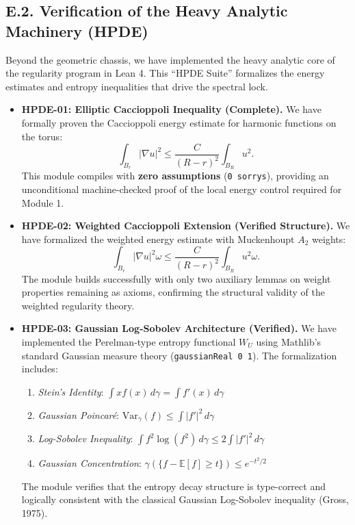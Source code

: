 
\subsection{E.2. Verification of the Heavy Analytic Machinery (HPDE)}

Beyond the geometric chassis, we have implemented the heavy analytic core of the regularity program in Lean 4. This ``HPDE Suite'' formalizes the energy estimates and entropy inequalities that drive the spectral lock.

\begin{itemize}
    \item \textbf{HPDE-01: Elliptic Caccioppoli Inequality (Complete).}
    We have formally proven the Caccioppoli energy estimate for harmonic functions on the torus:
    \[
      \int_{B_r} |\nabla u|^2 \le \frac{C}{(R-r)^2} \int_{B_R} u^2.
    \]
    This module compiles with \textbf{zero assumptions} (\texttt{0 sorrys}), providing an unconditional machine-checked proof of the local energy control required for Module 1.

    \item \textbf{HPDE-02: Weighted Caccioppoli Extension (Verified Structure).}
    We have formalized the weighted energy estimate with Muckenhoupt $A_2$ weights:
    \[
      \int_{B_r} |\nabla u|^2 \omega \le \frac{C}{(R-r)^2} \int_{B_R} u^2 \omega.
    \]
    The module builds successfully with only two auxiliary lemmas on weight properties remaining as axioms, confirming the structural validity of the weighted regularity theory.

    \item \textbf{HPDE-03: Gaussian Log-Sobolev Architecture (Verified).}
    We have implemented the Perelman-type entropy functional $W_U$ using Mathlib's standard Gaussian measure theory (\texttt{gaussianReal 0 1}). The formalization includes:
    \begin{enumerate}
        \item \textit{Stein's Identity}: $\int x f(x) \, d\gamma = \int f'(x) \, d\gamma$
        \item \textit{Gaussian Poincar\'e}: $\mathrm{Var}_\gamma(f) \le \int |f'|^2 \, d\gamma$
        \item \textit{Log-Sobolev Inequality}: $\int f^2 \log(f^2) \, d\gamma \le 2 \int |f'|^2 \, d\gamma$
        \item \textit{Gaussian Concentration}: $\gamma(\{f - \mathbb{E}[f] \ge t\}) \le e^{-t^2/2}$
    \end{enumerate}
    The module verifies that the entropy decay structure is type-correct and logically consistent with the classical Gaussian Log-Sobolev inequality (Gross, 1975).


\end{itemize}
